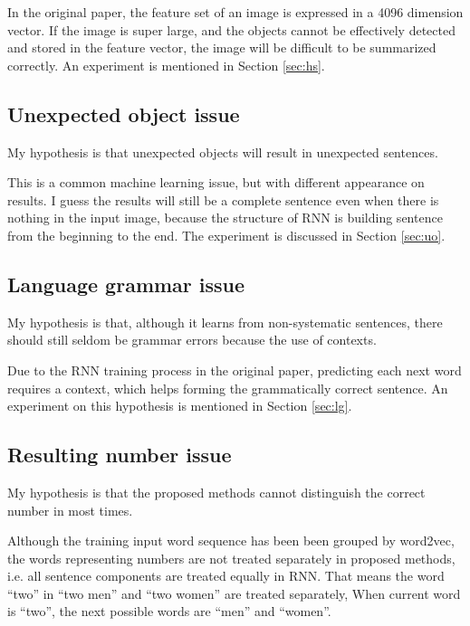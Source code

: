\documentclass[10pt,twocolumn,letterpaper]{article}
\begin{document}
In the original paper, the feature set of an image is expressed in a 4096 dimension vector.
If the image is super large, and the objects cannot be effectively detected and stored in the feature vector,
the image will be difficult to be summarized correctly. An experiment is mentioned in Section \ref{sec:hs}.


\subsection{Unexpected object issue}
My hypothesis is that unexpected objects will result in unexpected sentences.

This is a common machine learning issue, but with different appearance on results.
I guess the results will still be a complete sentence even when there is nothing in the input image,
because the structure of RNN is building sentence from the beginning to the end.
The experiment is discussed in Section \ref{sec:uo}.


\subsection{Language grammar issue}

My hypothesis is that, although it learns from non-systematic sentences,
there should still seldom be grammar errors because the use of contexts.

Due to the RNN training process in the original paper, predicting each next word requires a context,
which helps forming the grammatically correct sentence.
An experiment on this hypothesis is mentioned in Section \ref{sec:lg}.


\subsection{Resulting number issue} \label{sec:rni}
My hypothesis is that the proposed methods cannot distinguish the correct number in most times.

Although the training input word sequence has been been grouped by word2vec,
the words representing numbers are not treated separately in proposed methods,
i.e. all sentence components are treated equally in RNN.
That means the word ``two'' in ``two men'' and ``two women'' are treated separately,
When current word is ``two'', the next possible words are ``men'' and ``women''.
\end{document}
